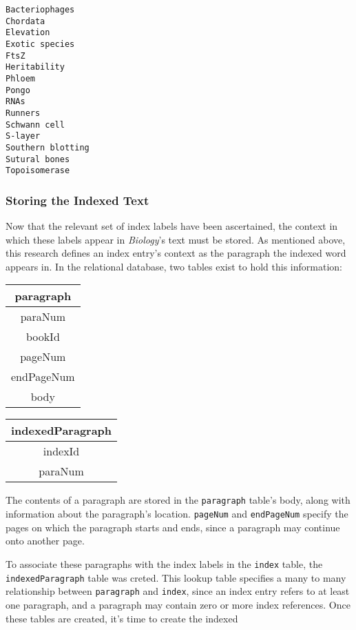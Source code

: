 \begin{multicols}{3}
\begin{verbatim}
Bacteriophages
Chordata
Elevation
Exotic species
FtsZ
Heritability
Phloem
Pongo
RNAs
Runners
Schwann cell
S-layer
Southern blotting
Sutural bones
Topoisomerase
\end{verbatim}
\end{multicols}

\subsubsection{Storing the Indexed Text}

Now that the relevant set of index labels have been ascertained, the context in which these labels appear in {\it Biology}'s text must be stored.
As mentioned above, this research defines an index entry's context as the paragraph the indexed word appears in.
In the relational database, two tables exist to hold this information:

\begin{center}
\begin{tabular}{|c|}
\hline 
\textbf{paragraph} \\ 
\hline 
paraNum \\ 
\hline 
bookId \\ 
\hline 
pageNum \\ 
\hline 
endPageNum \\ 
\hline 
body \\ 
\hline 
\end{tabular}
\end{center}

\begin{center}
\begin{tabular}{|c|}
\hline 
\textbf{indexedParagraph} \\ 
\hline 
indexId \\ 
\hline 
paraNum \\ 
\hline 
\end{tabular} 
\end{center}

The contents of a paragraph are stored in the {\tt paragraph} table's body, along with information about the paragraph's location.
{\tt pageNum} and {\tt endPageNum} specify the pages on which the paragraph starts and ends, since a paragraph may continue onto another page.

To associate these paragraphs with the index labels in the {\tt index} table, the {\tt indexedParagraph} table was creted.
This lookup table specifies a many to many relationship between {\tt paragraph} and {\tt index}, since an index entry refers to at least one paragraph, and a paragraph may contain zero or more index references. Once these tables are created, it's time to create the indexed

